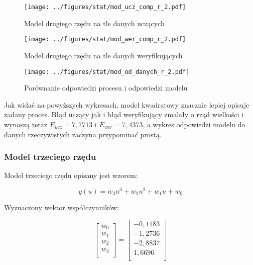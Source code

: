 \documentclass[a4paper,titlepage,11pt,floatssmall]{mwrep}
\begin{document}
\newpage

\begin{figure}[H]
\centering
\texttt{[image: ../figures/stat/mod\_ucz\_comp\_r\_2.pdf]}
\caption{Model drugiego rzędu na tle danych uczących}
\end{figure}

\begin{figure}[H]
\centering
\texttt{[image: ../figures/stat/mod\_wer\_comp\_r\_2.pdf]}
\caption{Model drugiego rzędu na tle danych weryfikujących}
\end{figure}

\newpage

\begin{figure}[H]
\centering
\texttt{[image: ../figures/stat/mod\_od\_danych\_r\_2.pdf]}
\caption{Porównanie odpowiedzi procesu i odpowiedzi modelu}
\end{figure}

Jak widać na powyższych wykresach, model kwadratowy znacznie lepiej opisuje zadany proces. Błąd uczący jak i błąd weryfikujący zmalały o rząd wielkości i wynoszą teraz $E_{ucz} = 7,7713$ i $E_{wer} = 7,4373$, a wykres odpowiedzi modelu do danych rzeczywistych zaczyna przypominać prostą.

\subsubsection{Model trzeciego rzędu}

Model trzeciego rzędu opisany jest wzorem:

\begin{equation*}
y(u) = w_3u^3 + w_2u^2 + w_1u + w_0
\end{equation*}

Wyznaczony wektor współczynników:

$$
\left[\begin{array}{c}
w_0 \\
w_1 \\
w_2 \\
w_3 \\
\end{array} \right]
= 
\left[\begin{array}{c}
-0,1183	\\
-1,2736 \\
-2,8837 \\
1,6696 \\ 
\end{array} \right]
$$
\end{document}
